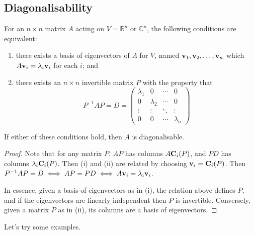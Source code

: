 \subsection{Diagonalisability}
\begin{proposition}
	For an \(n \times n\) matrix \(A\) acting on \(V = \mathbb R^n\) or \(\mathbb C^n\), the following conditions are equivalent:
	\begin{enumerate}
		\item there exists a basis of eigenvectors of \(A\) for \(V\), named \(\vb v_1, \vb v_2, \dots, \vb v_n\) which \(A\vb v_i = \lambda_i\vb v_i\) for each \(i\); and
		\item there exists an \(n \times n\) invertible matrix \(P\) with the property that
		      \[
			      P^{-1}AP = D = \begin{pmatrix}
				      \lambda_1 & 0         & \cdots & 0         \\
				      0         & \lambda_2 & \cdots & 0         \\
				      \vdots    & \vdots    & \ddots & \vdots    \\
				      0         & 0         & \cdots & \lambda_n
			      \end{pmatrix}
		      \]
	\end{enumerate}
	If either of these conditions hold, then \(A\) is diagonalisable.
\end{proposition}
\begin{proof}
	Note that for any matrix \(P\), \(AP\) has columns \(A\vb C_i(P)\), and \(PD\) has columns \(\lambda_i \vb C_i(P)\).
	Then (i) and (ii) are related by choosing \(\vb v_i = \vb C_i(P)\).
	Then \(P^{-1}AP = D \iff AP = PD \iff A\vb v_i = \lambda_i\vb v_i\).

	In essence, given a basis of eigenvectors as in (i), the relation above defines \(P\), and if the eigenvectors are linearly independent then \(P\) is invertible.
	Conversely, given a matrix \(P\) as in (ii), its columns are a basis of eigenvectors.
\end{proof}
Let's try some examples.
